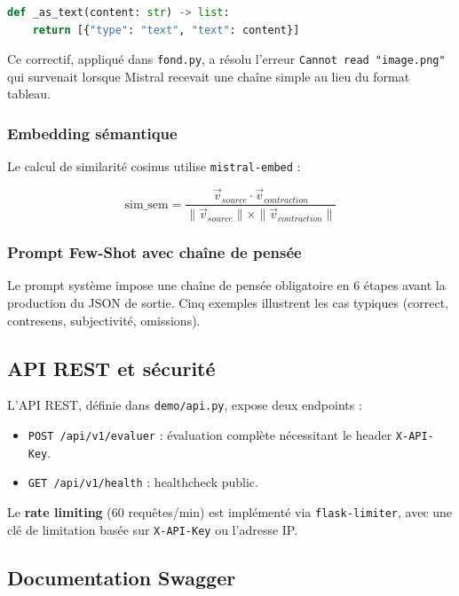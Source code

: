 \begin{lstlisting}[caption=Correctif du format content pour Mistral API 2026,language=Python]
def _as_text(content: str) -> list:
    return [{"type": "text", "text": content}]
\end{lstlisting}

Ce correctif, appliqué dans \texttt{fond.py}, a résolu l'erreur \texttt{Cannot read "image.png"} qui survenait lorsque Mistral recevait une chaîne simple au lieu du format tableau.

\subsubsection{Embedding sémantique}

Le calcul de similarité cosinus utilise \texttt{mistral-embed} :

\begin{equation}
\text{sim\_sem} = \frac{\vec{v}_{source} \cdot \vec{v}_{contraction}}{\|\vec{v}_{source}\| \times \|\vec{v}_{contraction}\|}
\end{equation}

\subsubsection{Prompt Few-Shot avec chaîne de pensée}

Le prompt système impose une chaîne de pensée obligatoire en 6 étapes avant la production du JSON de sortie. Cinq exemples illustrent les cas typiques (correct, contresens, subjectivité, omissions).

\subsection{API REST et sécurité}

L'API REST, définie dans \texttt{demo/api.py}, expose deux endpoints :

\begin{itemize}
    \item \texttt{POST /api/v1/evaluer} : évaluation complète nécessitant le header \texttt{X-API-Key}.
    \item \texttt{GET /api/v1/health} : healthcheck public.
\end{itemize}

Le \textbf{rate limiting} (60 requêtes/min) est implémenté via \texttt{flask-limiter}, avec une clé de limitation basée sur \texttt{X-API-Key} ou l'adresse IP.

\subsection{Documentation Swagger}

